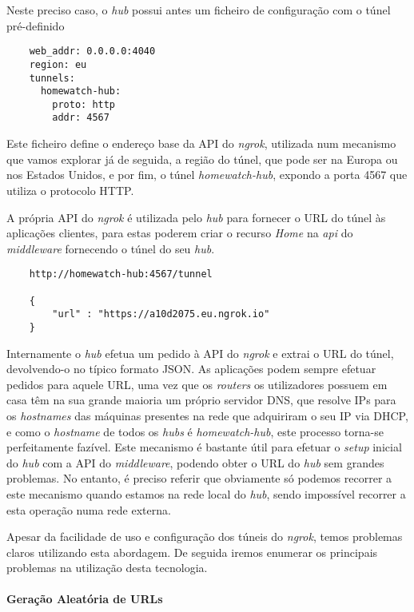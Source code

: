Neste preciso caso, o \textit{hub} possui antes um ficheiro de configuração com o túnel pré-definido

\begin{verbatim}
    web_addr: 0.0.0.0:4040
    region: eu
    tunnels:
      homewatch-hub:
        proto: http
        addr: 4567
\end{verbatim}

Este ficheiro define o endereço base da API do \textit{ngrok}, utilizada num mecanismo que vamos explorar já de seguida, a região do túnel, que pode ser na Europa ou nos Estados Unidos, e por fim, o túnel \textit{homewatch-hub}, expondo a porta 4567 que utiliza o protocolo HTTP.

A própria API do \textit{ngrok} é utilizada pelo \textit{hub} para fornecer o URL do túnel às aplicações clientes, para estas poderem criar o recurso \textit{Home} na \textit{api} do \textit{middleware} fornecendo o túnel do seu \textit{hub}.

\begin{verbatim}
    http://homewatch-hub:4567/tunnel

    {
        "url" : "https://a10d2075.eu.ngrok.io"
    }
\end{verbatim}

Internamente o \textit{hub} efetua um pedido à API do \textit{ngrok} e extrai o URL do túnel, devolvendo-o no típico formato JSON. As aplicações podem sempre efetuar pedidos para aquele URL, uma vez que os \textit{routers} os utilizadores possuem em casa têm na sua grande maioria um próprio servidor DNS, que resolve IPs para os \textit{hostnames} das máquinas presentes na rede que adquiriram o seu IP via DHCP, e como o \textit{hostname} de todos os \textit{hubs} é \textit{homewatch-hub}, este processo torna-se perfeitamente fazível. Este mecanismo é bastante útil para efetuar o \textit{setup} inicial do \textit{hub} com a API do \textit{middleware}, podendo obter o URL do \textit{hub} sem grandes problemas. No entanto, é preciso referir que obviamente só podemos recorrer a este mecanismo quando estamos na rede local do \textit{hub}, sendo impossível recorrer a esta operação numa rede externa.

Apesar da facilidade de uso e configuração dos túneis do \textit{ngrok}, temos problemas claros utilizando esta abordagem. De seguida iremos enumerar os principais problemas na utilização desta tecnologia.

\paragraph*{Geração Aleatória de URLs}

